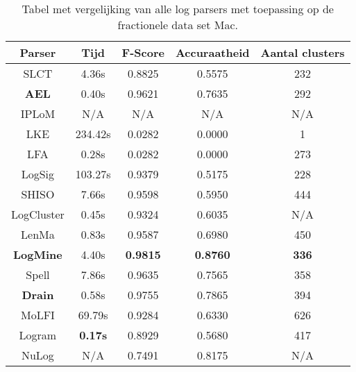 \begin{table}[!htp]
    \caption{Tabel met vergelijking van alle log parsers met toepassing op de fractionele data set Mac.}
    \label{table:Mac}
    \begin{center}
        \begin{tabular}{||c | c | c | c | c||} 
            \hline
            Parser & Tijd & F-Score & Accuraatheid & Aantal clusters \\ [0.5ex] 
            \hline\hline
            SLCT & 4.36s & 0.8825 & 0.5575 & 232 \\
            
            \textbf{AEL} & 0.40s & 0.9621 & 0.7635 & 292 \\ 
            
            IPLoM & N/A & N/A & N/A & N/A \\
            
            LKE & 234.42s & 0.0282 & 0.0000 & 1 \\
            
            LFA & 0.28s & 0.0282 & 0.0000 & 273 \\
            
            LogSig & 103.27s & 0.9379 & 0.5175 & 228 \\
            
            SHISO & 7.66s & 0.9598 & 0.5950 & 444 \\
            
            LogCluster & 0.45s & 0.9324 & 0.6035 & N/A \\
            
            LenMa & 0.83s & 0.9587 & 0.6980 & 450 \\
            
            \textbf{LogMine} & 4.40s & \textbf{0.9815} & \textbf{0.8760} & \textbf{336} \\
            
            Spell & 7.86s & 0.9635 & 0.7565 & 358 \\
            
            \textbf{Drain} & 0.58s & 0.9755 & 0.7865 & 394 \\
            
            MoLFI & 69.79s & 0.9284 & 0.6330 & 626 \\
            
            Logram & \textbf{0.17s} & 0.8929 & 0.5680 & 417 \\
            
            NuLog & N/A & 0.7491 & 0.8175 & N/A \\
            \hline
        \end{tabular}
    \end{center}
\end{table}

